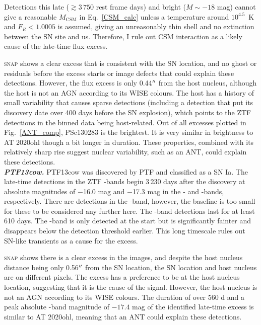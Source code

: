 \documentclass[a4paper,oneside,12pt, class=Latex/Classes/PhDthesisPSnPDF, crop=false]{standalone}
\begin{document}
Detections this late ($\gtrsim 3\,750$ rest frame days) and bright ($M \sim -18$ mag) cannot give a reasonable $M_\text{CSM}$ in Eq.~\ref{CSM_calc} unless a temperature around $10^{4.5}$~K and $F_R < 1.0005$ is assumed, giving an unreasonably thin shell and no extinction between the SN site and us. Therefore, I rule out CSM interaction as a likely cause of the late-time flux excess.

\textsc{snap} shows a clear excess that is consistent with the SN location, and no ghost or residuals before the excess starts or image defects that could explain these detections. However, the flux excess is only 0.44$^{\prime\prime}$ from the host nucleus, although the host is not an AGN according to its WISE colours. The host has a history of small variability that causes sparse detections (including a detection that put its discovery date over 400 days before the SN explosion), which points to the ZTF detections in the binned data being host-related. Out of all excesses plotted in Fig.~\ref{ANT_comp}, PSc130283 is the brightest. It is very similar in brightness to AT 2020ohl though a bit longer in duration. These properties, combined with its relatively sharp rise suggest nuclear variability, such as an ANT, could explain these detections.\\


\textit{\textbf{PTF13cow.}}
PTF13cow was discovered by PTF and classified as a SN Ia. The late-time detections in the ZTF \ztfg\ztfr\ztfi-bands begin 3\,230 days after the discovery at absolute magnitudes of $-$16.0 mag and $-$17.3 mag in the \ztfg- and \ztfr-bands, respectively. There are detections in the \ztfi-band, however, the baseline is too small for these to be considered any further here. The \ztfr-band detections last for at least 610 days. The \ztfg-band is only detected at the start but is significantly fainter and disappears below the detection threshold earlier. This long timescale rules out SN-like transients as a cause for the excess.

\textsc{snap} shows there is a clear excess in the images, and despite the host nucleus distance being only 0.56$^{\prime\prime}$ from the SN location, the SN location and host nucleus are on different pixels. The excess has a preference to be at the host nucleus location, suggesting that it is the cause of the signal. However, the host nucleus is not an AGN according to its WISE colours. The duration of over 560 d and a peak absolute \ztfr-band magnitude of $-17.4$ mag of the identified late-time excess is similar to AT 2020ohl, meaning that an ANT could explain these detections.\\
\end{document}
